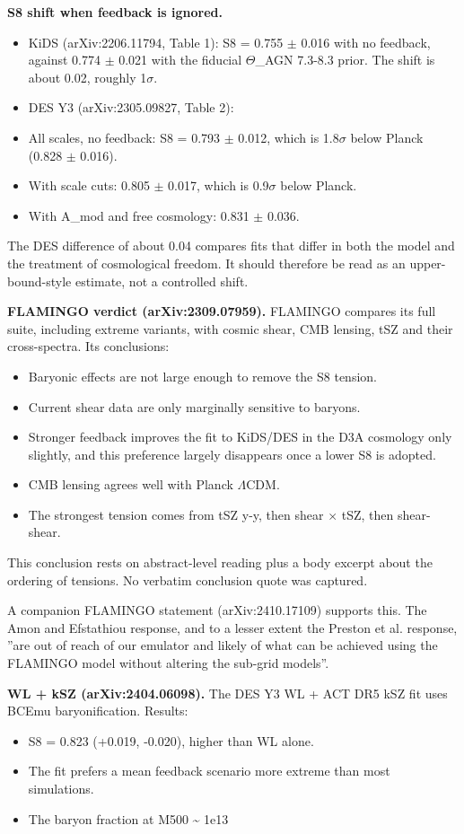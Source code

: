 \documentclass[11pt,a4paper]{article}
\begin{document}
\textbf{S8 shift when feedback is ignored.}

\begin{itemize}
  \item KiDS (arXiv:2206.11794, Table 1): S8 = 0.755 $\pm$ 0.016 with no feedback, against 0.774 $\pm$ 0.021 with the fiducial $\Theta$\_AGN 7.3-8.3 prior. The shift is about 0.02, roughly 1$\sigma$.
  \item DES Y3 (arXiv:2305.09827, Table 2):
  \item All scales, no feedback: S8 = 0.793 $\pm$ 0.012, which is 1.8$\sigma$ below Planck (0.828 $\pm$ 0.016).
  \item With scale cuts: 0.805 $\pm$ 0.017, which is 0.9$\sigma$ below Planck.
  \item With A\_mod and free cosmology: 0.831 $\pm$ 0.036.
\end{itemize}
  The DES difference of about 0.04 compares fits that differ in both the model and the treatment of cosmological freedom. It should therefore be read as an upper-bound-style estimate, not a controlled shift.

\textbf{FLAMINGO verdict (arXiv:2309.07959).} FLAMINGO compares its full suite, including extreme variants, with cosmic shear, CMB lensing, tSZ and their cross-spectra. Its conclusions:

\begin{itemize}
  \item Baryonic effects are not large enough to remove the S8 tension.
  \item Current shear data are only marginally sensitive to baryons.
  \item Stronger feedback improves the fit to KiDS/DES in the D3A cosmology only slightly, and this preference largely disappears once a lower S8 is adopted.
  \item CMB lensing agrees well with Planck $\Lambda$CDM.
  \item The strongest tension comes from tSZ y-y, then shear $\times$ tSZ, then shear-shear.
\end{itemize}
This conclusion rests on abstract-level reading plus a body excerpt about the ordering of tensions. No verbatim conclusion quote was captured.

A companion FLAMINGO statement (arXiv:2410.17109) supports this. The Amon and Efstathiou response, and to a lesser extent the Preston et al. response, ''are out of reach of our emulator and likely of what can be achieved using the FLAMINGO model without altering the sub-grid models''.

\textbf{WL + kSZ (arXiv:2404.06098).} The DES Y3 WL + ACT DR5 kSZ fit uses BCEmu baryonification. Results:

\begin{itemize}
  \item S8 = 0.823 (+0.019, -0.020), higher than WL alone.
  \item The fit prefers a mean feedback scenario more extreme than most simulations.
  \item The baryon fraction at M500 \textasciitilde{} 1e13
\end{itemize}
\end{document}
